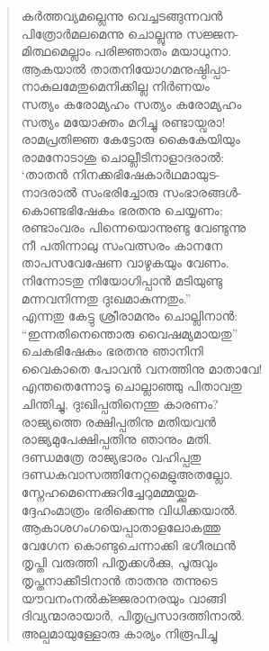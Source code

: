 \begin{verse}
കര്‍ത്തവ്യമല്ലെന്നു വെച്ചടങ്ങുന്നവന്‍\\
പിത്രോര്‍മലമെന്നു ചൊല്ലുന്നു സജ്ജന-\\
മിത്ഥമെല്ലാം പരിജ്ഞാതം മയാധുനാ.\\
ആകയാല്‍ താതനിയോഗമനുഷ്ഠിപ്പാ-\\
നാകുലമേതുമെനിക്കില്ല നിര്‍ണയം\\
സത്യം കരോമ്യഹം സത്യം കരോമ്യഹം\\
സത്യം മയോക്തം മറിച്ചു രണ്ടായ്വരാ!\\
രാമപ്രതിജ്ഞ കേട്ടോരു കൈകേയിയും\\
രാമനോടാശു ചൊല്ലീടിനാളാദരാല്‍:\\
‘താതന്‍ നിനക്കഭിഷേകാര്‍ഥമായുട-\\
നാദരാല്‍ സംഭരിച്ചോരു സംഭാരങ്ങള്‍-\\
കൊണ്ടഭിഷേകം ഭരതനു ചെയ്യണം;\\
രണ്ടാംവരം പിന്നെയൊന്നുണ്ടു വേണ്ടുന്നു\\
നീ പതിന്നാലു സംവത്സരം കാനനേ\\
താപസവേഷേണ വാഴുകയും വേണം.\\
നിന്നോടതു നിയോഗിപ്പാന്‍ മടിയുണ്ടു\\
മന്നവനിന്നതു ദുഃഖമാകുന്നതും.”\\
എന്നതു കേട്ടു ശ്രീരാമനും ചൊല്ലിനാന്‍:\\
“ഇന്നതിനെന്തൊരു വൈഷമ്യമായതു”\\
ചെകഭിഷേകം ഭരതനു ഞാനിനി\\
വൈകാതെ പോവന്‍ വനത്തിനു മാതാവേ!\\
എന്തതെന്നോടു ചൊല്ലാഞ്ഞു പിതാവതു\\
ചിന്തിച്ചു, ദുഃഖിപ്പതിനെന്തു കാരണം?\\
രാജ്യത്തെ രക്ഷിപ്പതിനു മതിയവന്‍\\
രാജ്യമുപേക്ഷിപ്പതിനു ഞാനും മതി.\\
ദണ്ഡമത്രേ രാജ്യഭാരം വഹിപ്പതു\\
ദണ്ഡകവാസത്തിനേറ്റമെളുഅതല്ലോ.\\
സ്നേഹമെന്നെക്കുറിച്ചേറുമമ്മയ്ക്കുമ-\\
ദ്ദേഹംമാത്രം ഭരിക്കെന്നു വിധിക്കയാല്‍.\\
ആകാശഗംഗയെപ്പാതാളലോകത്തു\\
വേഗേന കൊണ്ടുചെന്നാക്കി ഭഗീരഥന്‍\\
തൃപ്തി വരുത്തി പിതൃക്കള്‍ക്കു, പൂരുവും\\
തൃപ്തനാക്കീടിനാന്‍ താതനു തന്നുടെ\\
യൗവനംനല്‍ക്ജ്ജരാനരയും വാങ്ങി\\
ദിവ്യന്മാരായാര്‍, പിതൃപ്രസാദത്തിനാല്‍.\\
അല്പമായുള്ളോരു കാര്യം നിരൂപിച്ചു\\

\end{verse}
